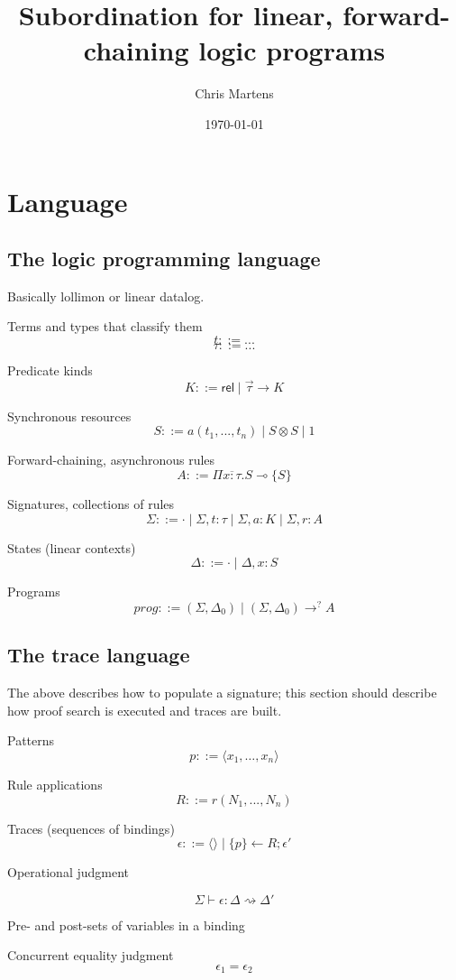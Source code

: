 \documentclass{article}
\title{Subordination for linear, forward-chaining logic programs}
\author{Chris Martens}
\date{\today}
\newcommand{\lolli}{\multimap}
\newcommand{\tensor}{\otimes}
\newcommand{\eps}{\epsilon}
\newcommand{\stepsto}{\rightsquigarrow}
\newcommand{\proves}{\longrightarrow}
\newcommand{\one}{\mathrm{1}}
\newcommand{\nileps}{\langle\rangle}
\begin{document}
\maketitle

\section{Language}

\subsection{The logic programming language}

Basically lollimon or linear datalog.

Terms and types that classify them
\[ t ::= ... \]
\[ \tau ::= ... \]

Predicate kinds
\[ K ::= \mathsf{rel} \mid \vec{\tau} \to K \]

Synchronous resources
\[ S ::= a(t_1, ..., t_n) \mid S \tensor S \mid \one \]

Forward-chaining, asynchronous rules
\[ A ::= \Pi \overline{x{:}\tau}. S \lolli \{S\} \]

Signatures, collections of rules
\[ \Sigma 
::= \cdot \mid \Sigma, t : \tau \mid \Sigma, a : K \mid \Sigma, r : A \]

States (linear contexts)
\[
\Delta ::= \cdot \mid \Delta, x : S
\]

Programs
\[
prog ::= (\Sigma, \Delta_0) \mid (\Sigma, \Delta_0) \proves^{?} A
\]


\subsection{The trace language}

The above describes how to populate a signature; this section should
describe how proof search is executed and traces are built.

Patterns
\[ p ::= \langle x_1, \dots, x_n \rangle \]

Rule applications
\[ R ::= r(N_1,...,N_n) \]

Traces (sequences of bindings)
\[
\eps ::= \nileps \mid \{ p \} \gets R ; \eps'
\]


Operational judgment

\[
\Sigma \vdash \eps : \Delta \stepsto \Delta'
\]

Pre- and post-sets of variables in a binding

Concurrent equality judgment
\[
\eps_1 = \eps_2
\]
\end{document}
